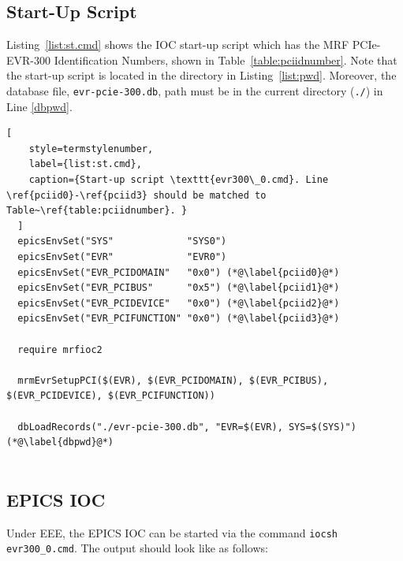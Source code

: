 \documentclass[11pt
  , a4paper
  , article
  , oneside
  , showtrims
]{memoir}
\begin{document}
\subsection{Start-Up Script}
Listing~\ref{list:st.cmd} shows the IOC start-up script which has the MRF PCIe-EVR-300 Identification Numbers, shown in Table~\ref{table:pciidnumber}. Note that the start-up script is located in the directory in Listing~\ref{list:pwd}. Moreover, the database file, \texttt{evr-pcie-300.db}, path must be in the current directory (\texttt{./}) in Line \ref{dbpwd}.


\begin{lstlisting}[
    style=termstylenumber,
    label={list:st.cmd},
    caption={Start-up script \texttt{evr300\_0.cmd}. Line \ref{pciid0}-\ref{pciid3} should be matched to Table~\ref{table:pciidnumber}. }
  ]
  epicsEnvSet("SYS"             "SYS0")
  epicsEnvSet("EVR"             "EVR0")
  epicsEnvSet("EVR_PCIDOMAIN"   "0x0") (*@\label{pciid0}@*)
  epicsEnvSet("EVR_PCIBUS"      "0x5") (*@\label{pciid1}@*)
  epicsEnvSet("EVR_PCIDEVICE"   "0x0") (*@\label{pciid2}@*)
  epicsEnvSet("EVR_PCIFUNCTION" "0x0") (*@\label{pciid3}@*)
  
  require mrfioc2
  
  mrmEvrSetupPCI($(EVR), $(EVR_PCIDOMAIN), $(EVR_PCIBUS), $(EVR_PCIDEVICE), $(EVR_PCIFUNCTION))
  
  dbLoadRecords("./evr-pcie-300.db", "EVR=$(EVR), SYS=$(SYS)") (*@\label{dbpwd}@*)
  
\end{lstlisting}

\subsection{EPICS IOC}
Under EEE, the EPICS IOC can be started via the command \texttt{iocsh evr300\_0.cmd}. The output should look like as follows:
\end{document}
